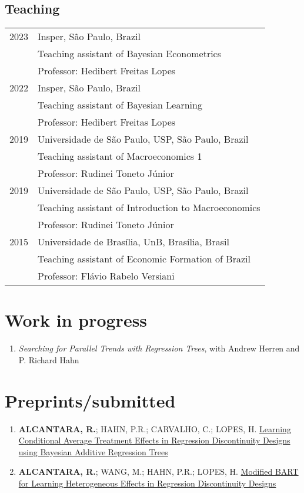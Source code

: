 \documentclass[10pt]{article}
\begin{document}
\subsection*{Teaching}
\label{sec:org3c7d8d1}
\begin{footnotesize}
  \begin{tabular}{ll}
    2023      & Insper, São Paulo, Brazil\\
	      & Teaching assistant of Bayesian Econometrics\\
	      & Professor: Hedibert Freitas Lopes\\
    2022      & Insper, São Paulo, Brazil\\
	      & Teaching assistant of Bayesian Learning\\
	      & Professor: Hedibert Freitas Lopes\\
    2019      & Universidade de São Paulo, USP, São Paulo, Brazil\\
	      & Teaching assistant of Macroeconomics 1\\
	      & Professor: Rudinei Toneto Júnior\\
    2019      & Universidade de São Paulo, USP, São Paulo, Brazil\\
	      & Teaching assistant of Introduction to Macroeconomics\\
	      & Professor: Rudinei Toneto Júnior\\
    2015      & Universidade de Brasília, UnB, Brasília, Brasil\\
	      & Teaching assistant of Economic Formation of Brazil\\
	      & Professor: Flávio Rabelo Versiani
  \end{tabular}
\end{footnotesize}

\section*{Work in progress}
\label{sec:working.papers}
\begin{enumerate}
	\item \textit{Searching for Parallel Trends with Regression Trees}, with Andrew Herren and P. Richard Hahn
\end{enumerate}

\section*{Preprints/submitted}
\label{sec:orgec47a03}
\begin{enumerate}
	\item \textbf{ALCANTARA, R.}; HAHN, P.R.; CARVALHO, C.; LOPES, H. \href{https://arxiv.org/abs/2503.00326}{Learning Conditional Average Treatment Effects in Regression Discontinuity Designs using Bayesian Additive Regression Trees}
	
	\item \textbf{ALCANTARA, R.}; WANG, M.; HAHN, P.R.; LOPES, H. \href{https://arxiv.org/abs/2407.14365}{Modified BART for Learning Heterogeneous Effects in Regression Discontinuity Designs}
\end{enumerate}
\end{document}
